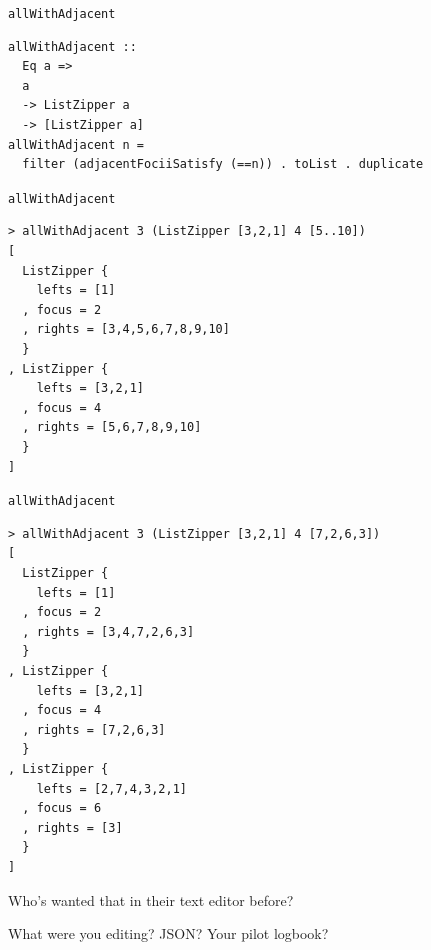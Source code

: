 \begin{frame}[fragile]
\begin{block}{\lstinline{allWithAdjacent}}
\begin{center}
\begin{lstlisting}[style=haskell]
allWithAdjacent ::
  Eq a =>
  a
  -> ListZipper a
  -> [ListZipper a]
allWithAdjacent n =
  filter (adjacentFociiSatisfy (==n)) . toList . duplicate
\end{lstlisting}
\end{center}
\end{block}
\end{frame}

\begin{frame}[fragile]
\begin{block}{\lstinline{allWithAdjacent}}
\begin{center}
\begin{lstlisting}[style=haskell]
> allWithAdjacent 3 (ListZipper [3,2,1] 4 [5..10])
[
  ListZipper {
    lefts = [1]
  , focus = 2
  , rights = [3,4,5,6,7,8,9,10]
  }
, ListZipper {
    lefts = [3,2,1]
  , focus = 4
  , rights = [5,6,7,8,9,10]
  }
]
\end{lstlisting}
\end{center}
\end{block}
\end{frame}

\begin{frame}[fragile]
\begin{block}{\lstinline{allWithAdjacent}}
\begin{center}
\begin{lstlisting}[style=haskell]
> allWithAdjacent 3 (ListZipper [3,2,1] 4 [7,2,6,3])
[
  ListZipper {
    lefts = [1]
  , focus = 2
  , rights = [3,4,7,2,6,3]
  }
, ListZipper {
    lefts = [3,2,1]
  , focus = 4
  , rights = [7,2,6,3]
  }
, ListZipper {
    lefts = [2,7,4,3,2,1]
  , focus = 6
  , rights = [3]
  }
]
\end{lstlisting}
\end{center}
\end{block}
\end{frame}

\begin{frame}
\begin{center}
Who's wanted that in their text editor before?
\end{center}
\end{frame}

\begin{frame}
\begin{center}
What were you editing? JSON? Your pilot logbook?
\end{center}
\end{frame}

